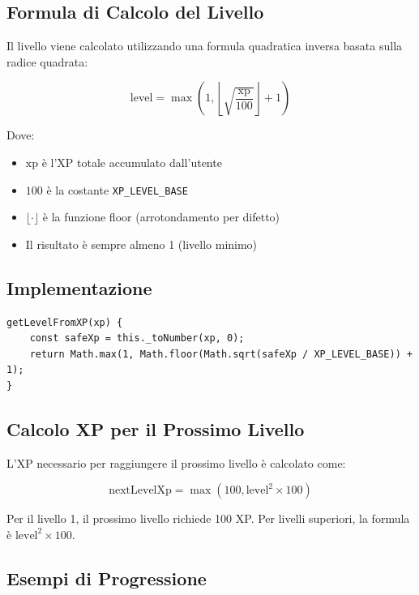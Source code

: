 \documentclass[11pt,a4paper]{article}
\begin{document}
\subsection{Formula di Calcolo del Livello}

Il livello viene calcolato utilizzando una formula quadratica inversa basata sulla radice quadrata:

\begin{equation}
\text{level} = \max\left(1, \left\lfloor \sqrt{\frac{\text{xp}}{100}} \right\rfloor + 1\right)
\end{equation}

Dove:
\begin{itemize}
    \item $\text{xp}$ è l'XP totale accumulato dall'utente
    \item $100$ è la costante \texttt{XP\_LEVEL\_BASE}
    \item $\lfloor \cdot \rfloor$ è la funzione floor (arrotondamento per difetto)
    \item Il risultato è sempre almeno 1 (livello minimo)
\end{itemize}

\subsection{Implementazione}

\begin{lstlisting}
getLevelFromXP(xp) {
    const safeXp = this._toNumber(xp, 0);
    return Math.max(1, Math.floor(Math.sqrt(safeXp / XP_LEVEL_BASE)) + 1);
}
\end{lstlisting}

\subsection{Calcolo XP per il Prossimo Livello}

L'XP necessario per raggiungere il prossimo livello è calcolato come:

\begin{equation}
\text{nextLevelXp} = \max(100, \text{level}^2 \times 100)
\end{equation}

Per il livello 1, il prossimo livello richiede 100 XP. Per livelli superiori, la formula è $\text{level}^2 \times 100$.

\subsection{Esempi di Progressione}
\end{document}
